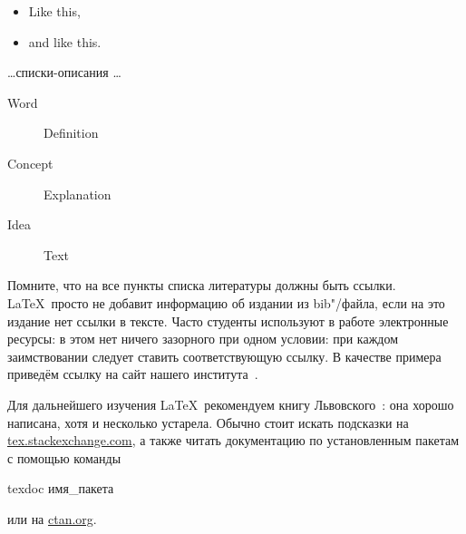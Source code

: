 \begin{itemize}
  \item Like this,
  \item and like this.
\end{itemize}

\dots списки-описания \dots

\begin{description}
  \item[Word] Definition
  \item[Concept] Explanation
  \item[Idea] Text
\end{description}

\Conc

Помните, что на все пункты списка литературы должны быть ссылки. \LaTeX\ просто не добавит информацию об издании из bib"/файла, если на это издание нет ссылки в тексте. Часто студенты используют в работе  электронные ресурсы: в этом нет ничего зазорного при одном условии: при каждом заимствовании следует ставить соответствующую ссылку. В качестве примера приведём ссылку на сайт нашего института~\autocite{mmcs}.

Для дальнейшего изучения \LaTeX\ рекомендуем книгу Львовского~\autocite{Lvo2003}: она хорошо написана, хотя и несколько устарела.
Обычно стоит искать подсказки на
\href{http://tex.stackexchange.com/}{tex.stackexchange.com}, а также
читать документацию по установленным пакетам с помощью
команды
\begin{Verb}
texdoc имя_пакета
\end{Verb}
или на \href{http://ctan.org/}{ctan.org}.

\printbibliography[%
    heading=bibintoc%
]


